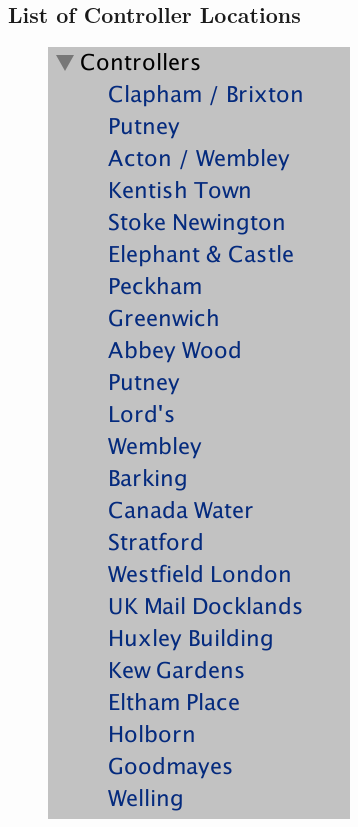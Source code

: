 \documentclass[a4paper,11pt,titlepage]{report}
\begin{document}
\begin{appendices}
\section{List of Controller Locations}
\begin{figure}[!hbpt]
  \center
  \includegraphics[width=0.5\linewidth]{img/listofcontrollerlocations.png}
\end{figure}

\end{appendices}
\end{document}
